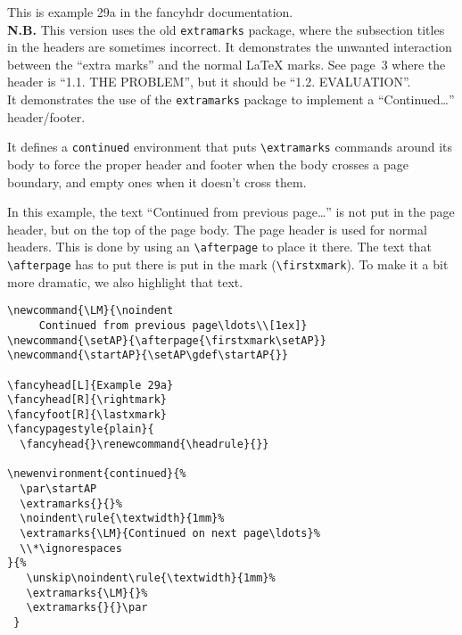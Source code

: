 \documentclass{report}
\newcommand{\LM}{\noindent\hl{Continued from previous page\ldots}\\[1ex]}
\newcommand{\setAP}{\afterpage{\firstxmark\setAP}}
\newcommand{\startAP}{\setAP\gdef\startAP{}}
\begin{document}
\tableofcontents

\thispagestyle{plain}
\noindent
\begin{boxedminipage}{\textwidth}
\small
This is example 29a in the fancyhdr documentation.
\\[1ex]
\textbf{N.B.} This version uses the old \texttt{extramarks} package, where the subsection titles in the headers are sometimes incorrect. It demonstrates the unwanted interaction between the ``extra marks'' and the normal \LaTeX{} marks. See page~3 where the header is ``1.1. THE PROBLEM'', but it should be ``1.2. EVALUATION''.
\\[1ex]
It demonstrates the use of the \texttt{extramarks} package to implement
a ``Continued\ldots'' header/footer.

It defines a \texttt{continued} environment that puts \verb|\extramarks| commands around its body to force the proper header and footer when the body crosses a page boundary, and empty ones when it doesn't cross them.

In this example, the text ``Continued from previous page\ldots'' is not put in the page header, but on the top of the page body. The page header is used for normal headers. This is done by using an \verb|\afterpage| to place it there. The text that \verb|\afterpage| has to put there is put in the mark (\verb|\firstxmark|). To make it a bit more dramatic, we also highlight that text.

\begin{verbatim}
\newcommand{\LM}{\noindent
     Continued from previous page\ldots\\[1ex]}
\newcommand{\setAP}{\afterpage{\firstxmark\setAP}}
\newcommand{\startAP}{\setAP\gdef\startAP{}}

\fancyhead[L]{Example 29a}
\fancyhead[R]{\rightmark}
\fancyfoot[R]{\lastxmark}
\fancypagestyle{plain}{
  \fancyhead{}\renewcommand{\headrule}{}}

\newenvironment{continued}{%
  \par\startAP
  \extramarks{}{}%
  \noindent\rule{\textwidth}{1mm}%
  \extramarks{\LM}{Continued on next page\ldots}%
  \\*\ignorespaces
}{%
   \unskip\noindent\rule{\textwidth}{1mm}%
   \extramarks{\LM}{}%
   \extramarks{}{}\par
 }
\end{verbatim}

\end{boxedminipage}

\pagestyle{fancy}
\end{document}
